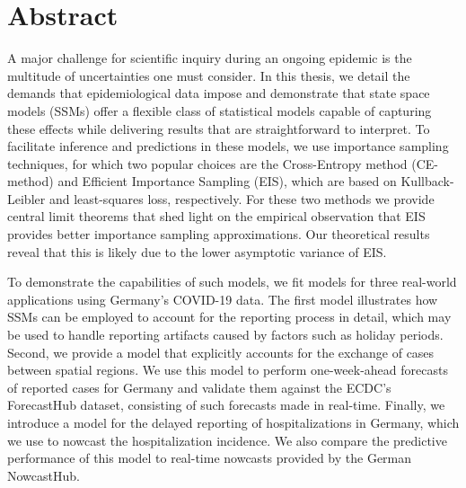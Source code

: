 \begingroup
\let\clearpage\relax
\let\cleardoublepage\relax
\let\cleardoublepage\relax

\chapter*{Abstract}
A major challenge for scientific inquiry during an ongoing epidemic is the multitude of uncertainties one must consider. 
In this thesis, we detail the demands that epidemiological data impose and demonstrate that state space models (SSMs) offer a flexible class of statistical models capable of capturing these effects while delivering results that are straightforward to interpret. 
To facilitate inference and predictions in these models, we use importance sampling techniques, for which two popular choices are the Cross-Entropy method (CE-method) and Efficient Importance Sampling (EIS), which are based on Kullback-Leibler and least-squares loss, respectively. For these two methods we provide central limit theorems that shed light on the empirical observation that EIS provides better importance sampling approximations. Our theoretical results reveal that this is likely due to the lower asymptotic variance of EIS. 

To demonstrate the capabilities of such models, we fit models for three real-world applications using Germany's COVID-19 data. 
The first model illustrates how SSMs can be employed to account for the reporting process in detail, which may be used to handle reporting artifacts caused by factors such as holiday periods.
Second, we provide a model that explicitly accounts for the exchange of cases between spatial regions. We use this model to perform one-week-ahead forecasts of reported cases for Germany and validate them against the ECDC's ForecastHub dataset, consisting of such forecasts made in real-time.
Finally, we introduce a model for the delayed reporting of hospitalizations in Germany, which we use to nowcast the hospitalization incidence. We also compare the predictive performance of this model to real-time nowcasts provided by the German NowcastHub.

\vfill

